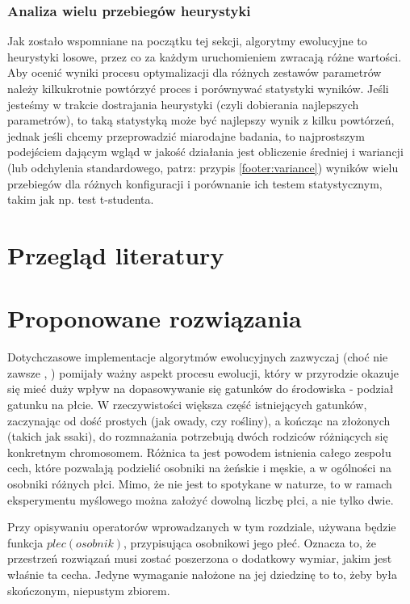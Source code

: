 \documentclass[twoside]{iisthesis}
\begin{document}
\subsection{Analiza wielu przebiegów heurystyki}

Jak zostało wspomniane na początku tej sekcji, algorytmy ewolucyjne to heurystyki losowe, przez co za każdym uruchomieniem zwracają różne wartości. Aby ocenić wyniki procesu optymalizacji dla różnych zestawów parametrów należy kilkukrotnie powtórzyć proces i porównywać statystyki wyników. Jeśli jesteśmy w trakcie dostrajania heurystyki (czyli dobierania najlepszych parametrów), to taką statystyką może być najlepszy wynik z kilku powtórzeń, jednak jeśli chcemy przeprowadzić miarodajne badania, to najprostszym podejściem dającym wgląd w jakość działania jest obliczenie średniej i wariancji (lub odchylenia standardowego, patrz: przypis \ref{footer:variance}) wyników wielu przebiegów dla różnych konfiguracji i porównanie ich testem statystycznym, takim jak np. test t-studenta.

\chapter{Przegląd literatury} \label{chapter:literature}

\chapter{Proponowane rozwiązania} \label{chapter:proposed}

Dotychczasowe implementacje algorytmów ewolucyjnych zazwyczaj (choć nie zawsze \cite{GGA}, \cite{SexualGA}) pomijały ważny aspekt procesu ewolucji, który w przyrodzie okazuje się mieć duży wpływ na dopasowywanie się gatunków do środowiska - podział gatunku na płcie. 
W rzeczywistości większa część istniejących gatunków, zaczynając od dość prostych (jak owady, czy rośliny), a kończąc na złożonych (takich jak ssaki), do rozmnażania potrzebują dwóch rodziców różniących się konkretnym chromosomem. 
Różnica ta jest powodem istnienia całego zespołu cech, które pozwalają podzielić osobniki na żeńskie i męskie, a w ogólności na osobniki różnych płci. 
Mimo, że nie jest to spotykane w naturze, to w ramach eksperymentu myślowego można założyć dowolną liczbę płci, a nie tylko dwie.

Przy opisywaniu operatorów wprowadzanych w tym rozdziale, używana będzie funkcja $plec(osobnik)$, przypisująca osobnikowi jego płeć.
Oznacza to, że przestrzeń rozwiązań musi zostać poszerzona o dodatkowy wymiar, jakim jest właśnie ta cecha.
Jedyne wymaganie nałożone na jej dziedzinę to to, żeby była skończonym, niepustym zbiorem.
\end{document}
